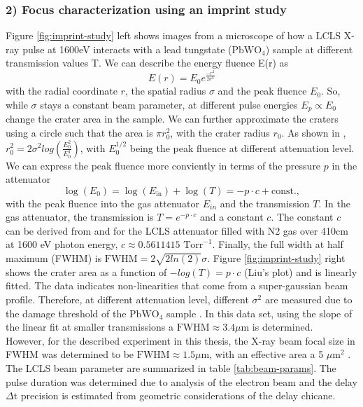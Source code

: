 \subsubsection{2) Focus characterization using an imprint study}
Figure \ref{fig:imprint-study} left shows images from a microscope of how a LCLS X-ray pulse at 1600eV interacts with a lead tungstate ($\text{PbWO}_{4}$) sample at different transmission values T. We can describe the energy fluence E(r) as
\begin{equation}
E(r) = E_{0} e^{\frac{-r^{2}}{2 \sigma^{2}}} 
\end{equation}
with the radial coordinate $r$, the spatial radius $\sigma$ and the peak fluence $E_{0}$. So, while $\sigma$ stays a constant beam parameter, at different pulse energies $E_{p}\propto E_{0}$ change the crater area in the sample. We can further approximate the craters using a circle such that the area is $\pi r_{0}^{2}$, with the crater radius $r_{0}$. As shown in \citep{Liu-1982-OptLett}, $r_{0}^{2}=2\sigma^{2}log(\frac{E_{0}^{2}}{E_{0}^{1}})$, with $E_{0}^{1/2}$ being the peak fluence at different attenuation level. We can express the peak fluence more conviently in terms of the pressure $p$ in the attenuator
\begin{equation}
\log(E_{0}) = \log(E_{\text{in}})+\log(T)= -p \cdot c + \text{const.},
\label{eq:gaussian-beam-imprint}
\end{equation}
with the peak fluence into the gas attenuator $E_{in}$ and the transmission $T$. In the gas attenuator, the transmission is $T=e^{-p \cdot c}$ and a constant $c$. The constant $c$ can be derived from \citep{Henke-1993-ADNDT} and for the LCLS attenuator filled with N2 gas over 410cm at 1600 eV photon energy, $c\approx 0.5611415 \text{ Torr}^{-1}$. Finally, the full width at half maximum (FWHM) is $\text{FWHM}=2\sqrt{2 ln(2)}\sigma$. Figure \ref{fig:imprint-study} right shows the crater area as a function of $-log(T)= p \cdot c$ (Liu's plot) and is linearly fitted. The data indicates non-linearities that come from a super-gaussian beam profile. Therefore, at different attenuation level, different $\sigma^{2}$ are measured due to the damage threshold of the $\text{PbWO}_{4}$ sample \citep{Chalupsky-2010-OE,Chalupsky-2013-OE}. In this data set, using the slope of the linear fit at smaller transmissions a $\text{FWHM}\approx 3.4 \mu$m is determined.\\ 
However, for the described experiment in this thesis, the X-ray beam focal size in FWHM was determined to be $\text{FWHM}\approx 1.5\mu$m, with an effective area a 5 $\mu\text{m}^2$ \citep{Bucher-2016-Unpublished}. The LCLS beam parameter are summarized in table \ref{tab:beam-params}. The pulse duration was determined due to analysis of the electron beam and the delay $\Delta$t precision is estimated from geometric considerations of the delay chicane.
